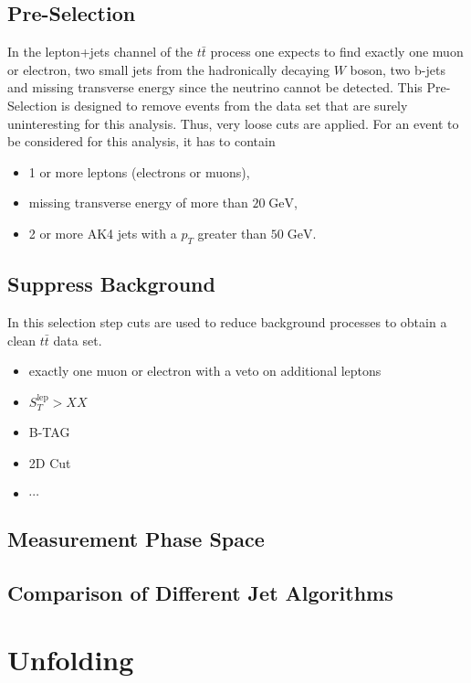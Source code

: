 \subsection{Pre-Selection}
\label{sec:PreSel}
	In the lepton+jets channel of the $t\bar{t}$ process one expects to find exactly one muon or electron, two small jets from the hadronically decaying $W$ boson, two b-jets and missing transverse energy since the neutrino cannot be detected. This Pre-Selection is designed to remove events from the data set that are surely uninteresting for this analysis. Thus, very loose cuts are applied. For an event to be considered for this analysis, it has to contain
	\begin{itemize}
	\item 1 or more leptons (electrons or muons),
	\item missing transverse energy of more than $20\;\text{GeV}$,
	\item 2 or more AK4 jets with a $p_T$ greater than $50\;\text{GeV}$.
	\end{itemize}
	
\subsection{Suppress Background}
\label{sec:BackSel}
	In this selection step cuts are used to reduce background processes to obtain a clean $t\bar{t}$ data set. 
	\begin{itemize}
	\item exactly one muon or electron with a veto on additional leptons
	\item $S_T^\text{lep} > XX$
	\item B-TAG
	\item 2D Cut
	\item $\cdots$
	\end{itemize}
\subsection{Measurement Phase Space}
\label{sec:FinalSel}
\subsection{Comparison of Different Jet Algorithms}

\section{Unfolding}